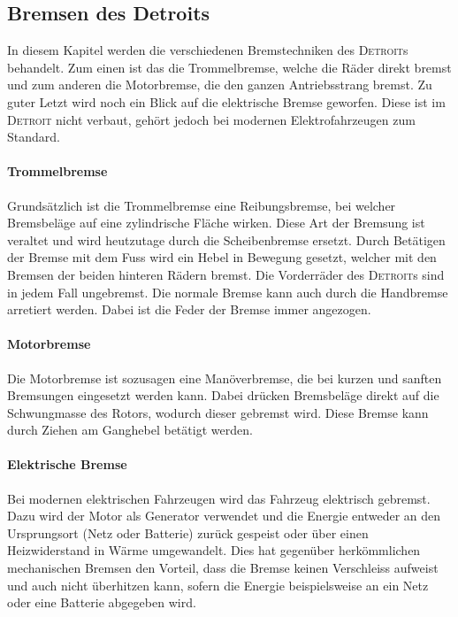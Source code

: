 \subsection{Bremsen des Detroits}\label{bremse}

In diesem Kapitel werden die verschiedenen Bremstechniken des \textsc{Detroit}s behandelt. Zum einen ist das die Trommelbremse, welche die Räder direkt bremst und zum anderen die Motorbremse, die den ganzen Antriebsstrang bremst. Zu guter Letzt wird noch ein Blick auf die elektrische Bremse geworfen. Diese ist im \textsc{Detroit} nicht verbaut, gehört jedoch bei modernen Elektrofahrzeugen zum Standard.

\paragraph{Trommelbremse}

Grundsätzlich ist die Trommelbremse eine Reibungsbremse, bei welcher Bremsbeläge auf eine zylindrische Fläche wirken. Diese Art der Bremsung ist veraltet und wird heutzutage durch die Scheibenbremse ersetzt. Durch Betätigen der Bremse mit dem Fuss wird ein Hebel in Bewegung gesetzt, welcher mit den Bremsen der beiden hinteren Rädern bremst. Die Vorderräder des \textsc{Detroit}s sind in jedem Fall ungebremst. Die normale Bremse kann auch durch die Handbremse arretiert werden. Dabei ist die Feder der Bremse immer angezogen.

\paragraph{Motorbremse}

Die Motorbremse ist sozusagen eine Manöverbremse, die bei kurzen und sanften Bremsungen eingesetzt werden kann. Dabei drücken Bremsbeläge direkt auf die Schwungmasse des Rotors, wodurch dieser gebremst wird. Diese Bremse kann durch Ziehen am Ganghebel betätigt werden.

\paragraph{Elektrische Bremse}
Bei modernen elektrischen Fahrzeugen wird das Fahrzeug elektrisch gebremst. Dazu wird der Motor als Generator verwendet und die Energie entweder an den Ursprungsort (Netz oder Batterie) zurück gespeist oder über einen Heizwiderstand in Wärme umgewandelt. Dies hat gegenüber herkömmlichen mechanischen Bremsen den Vorteil, dass die Bremse keinen Verschleiss aufweist und auch nicht überhitzen kann, sofern die Energie beispielsweise an ein Netz oder eine Batterie abgegeben wird.

